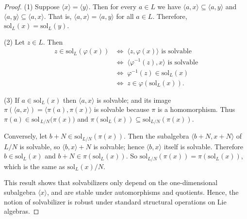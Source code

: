 \documentclass[11pt]{amsart}
\theoremstyle{plain}
\def\N{\mathbb{N}}
\def\sol{\mathrm{sol}}
\begin{document}
\begin{proof}
(1)\; Suppose $\langle x\rangle=\langle y\rangle$. Then for every
$a\in L$ we have $\langle a, x\rangle \subseteq \langle a, y\rangle$ and $\langle a, y\rangle \subseteq \langle a, x\rangle$. That is, $\langle a, x\rangle = \langle a, y\rangle$ for all $a\in L$. Therefore, $\sol_L(x) = \sol_L(y)$. \smallskip

\noindent (2)\; Let $z\in L$.  Then
\begin{align*}
z \in \sol_L(\varphi(x)) & \Longleftrightarrow\; \langle z, \varphi(x)\rangle \text{ is solvable} \\
& \Longleftrightarrow\;  \langle\varphi^{-1}(z),x\rangle \text{ is solvable}\\
& \Longleftrightarrow\; \varphi^{-1}(z)\in\sol_L(x)\\
& \Longleftrightarrow\; z\in\varphi(\sol_L(x)).
\end{align*}

\smallskip
\noindent (3)\; If $a\in\sol_L(x)$ then $\langle a,x\rangle$ is solvable; and its image $\pi(\langle a,x\rangle)=\langle \pi(a),\pi(x)\rangle$ is solvable because $\pi$ is a homomorphism.
Thus $\pi(a)\in\sol_{\,L/N}\bigl(\pi(x)\bigr)$ and $\pi(\sol_L(x)) \subseteq \sol_{L/N}(\pi(x))$.

Conversely, let $b+N\in\sol_{L/N}(\pi(x))$. Then the subalgebra $\langle b+N, x+N\rangle$ of $L/N$ is solvable, so $\langle b, x\rangle+N$ is solvable; hence $\langle b,x\rangle$ itself is solvable. Therefore $b\in\sol_L(x)$ and $b+N\in \pi(\sol_L(x))$. So $\sol_{L/N}(\pi(x))=\pi(\sol_L(x))$, which is the same as $\sol_L(x)/N$.

This result shows that solvabilizers only depend on the one-dimensional subalgebra $\langle x \rangle$, and are stable under automorphisms and quotients. Hence, the notion of solvabilizer is robust under standard structural operations 
on Lie algebras.





\end{proof}
\end{document}
